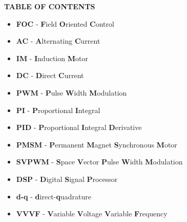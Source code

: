 \begin{center}
    {\large \textbf{TABLE OF CONTENTS}}
\end{center}

\vspace{0.1in}

\begin{center}
\end{center}

\tableofcontents

\newpage
\listoffigures
{}

\newpage
\listoftables
{}
\newpage

\newpage
{}

\vspace{10mm}

\begin{itemize}
\item[]\textbf{ FOC} - \textbf{F}ield \textbf{O}riented \textbf{C}ontrol

\item[]\textbf{ AC} - \textbf{A}lternating \textbf{C}urrent
\item[]\textbf{ IM} - \textbf{I}nduction \textbf{M}otor

\item[]\textbf{ DC} - \textbf{D}irect \textbf{C}urrent
\item[]\textbf{ PWM} - \textbf{P}ulse \textbf{W}idth \textbf{M}odulation
\item[]\textbf{ PI} - \textbf{P}roportional \textbf{I}ntegral

\item[]\textbf{ PID} - \textbf{P}roportional \textbf{I}ntegral \textbf{D}erivative

\item[]\textbf{ PMSM} - \textbf{P}ermanent \textbf{M}agnet \textbf{S}ynchronous \textbf{M}otor
\item[]\textbf{ SVPWM} - \textbf{S}pace \textbf{V}ector \textbf{P}ulse \textbf{W}idth \textbf{M}odulation
\item[]\textbf{ DSP} - \textbf{D}igital \textbf{S}ignal \textbf{P}rocessor
\item[]\textbf{ d-q} - \textbf{d}irect-\textbf{q}uadrature
\item[]\textbf{ VVVF} - \textbf{V}ariable \textbf{V}oltage \textbf{V}ariable \textbf{F}requency


\end{itemize}

\newpage